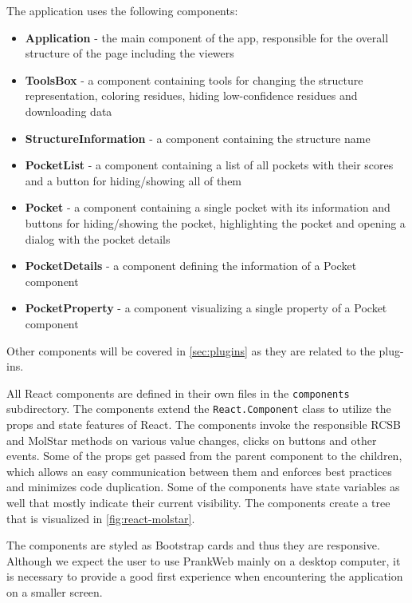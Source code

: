 The application uses the following components:

\begin{itemize}
    \item \textbf{Application} - the main component of the app, responsible for the overall structure of the page including the viewers
    \item \textbf{ToolsBox} - a component containing tools for changing the structure representation, coloring residues, hiding low-confidence residues and downloading data
    \item \textbf{StructureInformation} - a component containing the structure name
    \item \textbf{PocketList} - a component containing a list of all pockets with their scores and a button for hiding/showing all of them
    \item \textbf{Pocket} - a component containing a single pocket with its information and buttons for hiding/showing the pocket, highlighting the pocket and opening a dialog with the pocket details
    \item \textbf{PocketDetails} - a component defining the information of a Pocket component
    \item \textbf{PocketProperty} - a component visualizing a single property of a Pocket component
\end{itemize}

Other components will be covered in \cref{sec:plugins} as they are related to the plug-ins.

All React components are defined in their own files in the \texttt{components} subdirectory. The components extend the \texttt{React.Component} class to utilize the props and state features of React. The components invoke the responsible RCSB and MolStar methods on various value changes, clicks on buttons and other events. Some of the props get passed from the parent component to the children, which allows an easy communication between them and enforces best practices and minimizes code duplication. Some of the components have state variables as well that mostly indicate their current visibility. The components create a tree that is visualized in \cref{fig:react-molstar}.

The components are styled as Bootstrap cards and thus they are responsive. Although we expect the user to use PrankWeb mainly on a desktop computer, it is necessary to provide a good first experience when encountering the application on a smaller screen.


